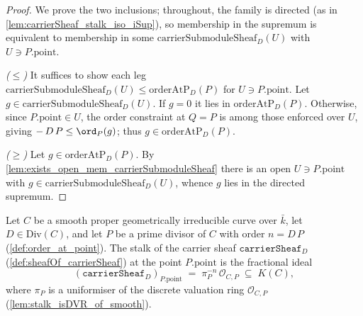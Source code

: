 \begin{proof}
  We prove the two inclusions; throughout, the family is directed (as in
  \cref{lem:carrierSheaf_stalk_iso_iSup}), so membership in the supremum is
  equivalent to membership in some \(\mathrm{carrierSubmoduleSheaf}_D(U)\) with
  \(U \ni P.\mathrm{point}\).

  \emph{(\(\le\))} It suffices to show each leg
  \(\mathrm{carrierSubmoduleSheaf}_D(U) \le \mathrm{orderAtP}_D(P)\) for \(U \ni
  P.\mathrm{point}\). Let \(g \in \mathrm{carrierSubmoduleSheaf}_D(U)\). If
  \(g = 0\) it lies in \(\mathrm{orderAtP}_D(P)\). Otherwise, since
  \(P.\mathrm{point} \in U\), the order constraint at \(Q = P\) is among those
  enforced over \(U\), giving \(-\,D\,P \le \ord_P(g)\); thus
  \(g \in \mathrm{orderAtP}_D(P)\).

  \emph{(\(\ge\))} Let \(g \in \mathrm{orderAtP}_D(P)\). By
  \cref{lem:exists_open_mem_carrierSubmoduleSheaf} there is an open \(U \ni
  P.\mathrm{point}\) with \(g \in \mathrm{carrierSubmoduleSheaf}_D(U)\), whence
  \(g\) lies in the directed supremum.
\end{proof}

\begin{lemma}
  \label{lem:carrierSheaf_stalk_eq_fractionalIdeal}
  Let \(C\) be a smooth proper geometrically irreducible curve over \(\bar k\),
  let \(D \in \mathrm{Div}(C)\), and let \(P\) be a prime divisor of \(C\) with
  order \(n = D\,P\) (\cref{def:order_at_point}). The stalk of the carrier sheaf
  \(\texttt{carrierSheaf}_D\) (\cref{def:sheafOf_carrierSheaf}) at the point
  \(P.\mathrm{point}\) is the fractional ideal
  \[
    (\texttt{carrierSheaf}_D)_{P.\mathrm{point}} \;=\;
    \pi_P^{-n}\,\mathcal O_{C,P} \;\subseteq\; K(C),
  \]
  where \(\pi_P\) is a uniformiser of the discrete valuation ring
  \(\mathcal O_{C,P}\) (\cref{lem:stalk_isDVR_of_smooth}).
\end{lemma}

